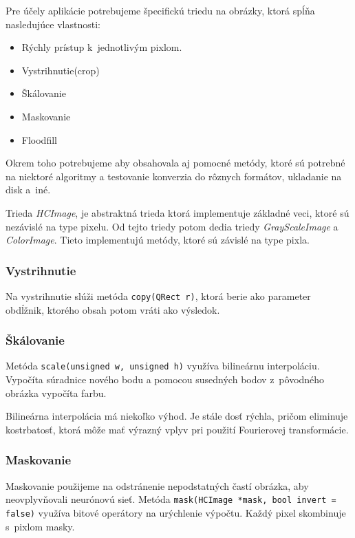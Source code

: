 Pre účely aplikácie potrebujeme špecifickú triedu na obrázky, ktorá spĺňa nasledujúce vlastnosti:
\begin{itemize}
\item Rýchly prístup k~jednotlivým pixlom.
\item Vystrihnutie(crop)
\item Škálovanie
\item Maskovanie
\item Floodfill
\end{itemize}
Okrem toho potrebujeme aby obsahovala aj pomocné metódy, ktoré sú potrebné na niektoré algoritmy a testovanie konverzia do rôznych formátov, ukladanie na disk a~iné.

Trieda \textit{HCImage}, je abstraktná trieda ktorá implementuje základné veci, ktoré sú nezávislé na type pixelu. Od tejto triedy potom dedia triedy \textit{GrayScaleImage} a \textit{ColorImage}. Tieto implementujú metódy, ktoré sú závislé na type pixla. 

\subsubsection{Vystrihnutie}
Na vystrihnutie slúži metóda {\tt copy(QRect r)}, ktorá berie ako parameter obdĺžnik, ktorého obsah potom vráti ako výsledok. 

\subsubsection{Škálovanie}
Metóda {\tt scale(unsigned w, unsigned h)} využíva bilineárnu interpoláciu. Vypočíta súradnice nového bodu a pomocou susedných bodov z~pôvodného obrázka vypočíta farbu.

Bilineárna interpolácia má niekoľko výhod. Je stále dosť rýchla, pričom eliminuje kostrbatosť, ktorá môže mať výrazný vplyv pri použití Fourierovej transformácie.

\subsubsection{Maskovanie}
Maskovanie použijeme na odstránenie nepodstatných častí obrázka, aby neovplyvňovali neurónovú sieť. Metóda {\tt mask(HCImage *mask, bool invert = false)} využíva bitové operátory na urýchlenie výpočtu. Každý pixel skombinuje s~pixlom masky. 

